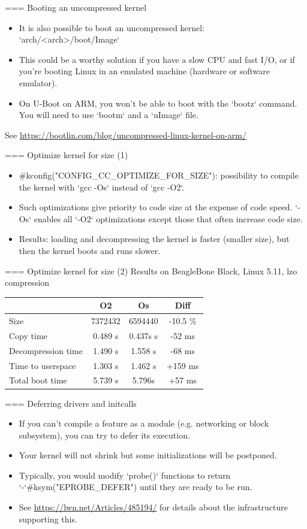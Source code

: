=== Booting an uncompressed kernel
\begin{itemize}
    \item It is also possible to boot an uncompressed kernel:\\
          `arch/<arch>/boot/Image`
    \item This could be a worthy solution if you have a slow CPU
	  and fast I/O, or if you're booting Linux in an emulated
	  machine (hardware or software emulator).
    \item On U-Boot on ARM, you won't be able to boot with the
	  `bootz` command. You will need to use `bootm`
	  and a `uImage` file.
\end{itemize}
See \url{https://bootlin.com/blog/uncompressed-linux-kernel-on-arm/}


=== Optimize kernel for size (1)
\begin{itemize}
\item #kconfig("CONFIG_CC_OPTIMIZE_FOR_SIZE"): possibility to compile the kernel
      with `gcc -Os` instead of `gcc -O2`.
\item Such optimizations give priority to code size at the expense of code speed.
      `-Os` enables all `-O2` optimizations except those that
      often increase code size.
\item Results: loading and decompressing the kernel is faster (smaller
      size), but then the kernel boots and runs slower.
\end{itemize}


=== Optimize kernel for size (2)
Results on BeagleBone Black, Linux 5.11, lzo compression
\begin{tabular}{| l || c | c | c |}
\hline
& O2 & Os & Diff \\
\hline Size & 7372432 & 6594440 & -10.5 \% \\
Copy time &  0.489 s & 0.437s s & -52 ms \\
Decompression time & 1.490 s & 1.558 s & -68 ms \\
Time to userspace & 1.303 s & 1.462 s & +159 ms \\
Total boot time & 5.739 s & 5.796s & +57 ms \\
\hline
\end{tabular}
\newline\newline


=== Deferring drivers and initcalls
\begin{itemize}
\item If you can't compile a feature as a module (e.g. networking or block
      subsystem), you can try to defer its execution.
\item Your kernel will not shrink but some initializations will be
      postponed.
\item Typically, you would modify `probe()` functions to return
      `-`#ksym("EPROBE_DEFER") until they are ready to be run.
\item See \url{https://lwn.net/Articles/485194/} for details about the
      infrastructure supporting this.
\end{itemize}


